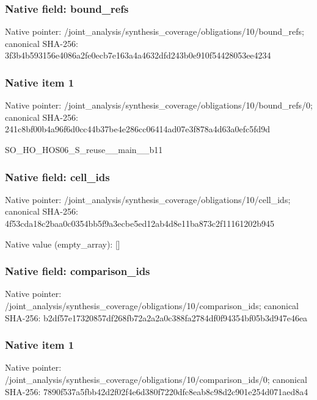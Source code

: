 \documentclass[10pt,a4paper]{article}
\begin{document}
\subsubsection{Native field: bound\_\allowbreak{}refs}
Native pointer: /joint\_\allowbreak{}analysis/synthesis\_\allowbreak{}coverage/obligations/10/bound\_\allowbreak{}refs; canonical SHA-256: 3f3b4b593156e4086a2fe0ecb7e163a4a4632dfd243b0e910f54428053ee4234

\subsubsection{Native item 1}
Native pointer: /joint\_\allowbreak{}analysis/synthesis\_\allowbreak{}coverage/obligations/10/bound\_\allowbreak{}refs/0; canonical SHA-256: 241c8bf00b4a96f6d0cc44b37be4e286cc06414ad07e3f878a4d63a0efc5fd9d

\begingroup\raggedright\sloppy SO\_\allowbreak{}HO\_\allowbreak{}HOS06\_\allowbreak{}S\_\allowbreak{}reuse\_\allowbreak{}\_\allowbreak{}main\_\allowbreak{}\_\allowbreak{}b11\par\endgroup

\subsubsection{Native field: cell\_\allowbreak{}ids}
Native pointer: /joint\_\allowbreak{}analysis/synthesis\_\allowbreak{}coverage/obligations/10/cell\_\allowbreak{}ids; canonical SHA-256: 4f53cda18c2baa0c0354bb5f9a3ecbe5ed12ab4d8e11ba873c2f11161202b945

Native value (empty\_\allowbreak{}array): []

\subsubsection{Native field: comparison\_\allowbreak{}ids}
Native pointer: /joint\_\allowbreak{}analysis/synthesis\_\allowbreak{}coverage/obligations/10/comparison\_\allowbreak{}ids; canonical SHA-256: b2df57e17320857df268fb72a2a2a0c388fa2784df0f94354bf05b3d947e46ea

\subsubsection{Native item 1}
Native pointer: /joint\_\allowbreak{}analysis/synthesis\_\allowbreak{}coverage/obligations/10/comparison\_\allowbreak{}ids/0; canonical SHA-256: 7890f537a5fbb42d2f02f4e6d380f7220dfc8eab8c98d2c901e254d071aed8a4
\end{document}
